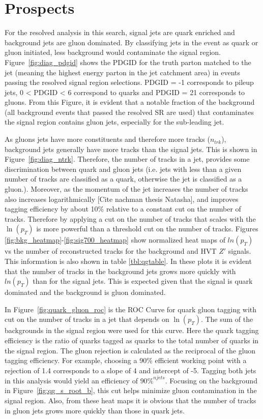 \label{ch:qg}
\chapter{Prospects}
For the resolved analysis in this search, signal jets are quark enriched and background jets are gluon dominated. By classifying jets in the event as quark or gluon initiated, less background would contaminate the signal region. Figure~\ref{fig:diag_pdgid} shows the PDGID for the truth parton matched to the jet (meaning the highest energy parton in the jet catchment area) in events passing the resolved signal region selections. PDGID = -1 corresponds to pileup jets, 0 < PDGID < 6 correspond to quarks and PDGID = 21 corresponds to gluons. From this Figure, it is evident that a notable fraction of the background (all background events that passed the resolved SR are used) that contaminates the signal region contains gluon jets, especially for the sub-leading jet. 

As gluons jets have more constituents and therefore more tracks ($n_{trk}$), background jets generally have more tracks than the signal jets. This is shown in Figure~\ref{fig:diag_ntrk}. Therefore, the number of tracks in a jet, provides some discrimination between quark and gluon jets (i.e. jets with less than a given number of tracks are classified as a quark, otherwise the jet is classified as a gluon.). Moreover, as the momentum of the jet increases the number of tracks also increases logarithmically [Cite nachman thesis Natasha], and improves tagging efficiency by about 10\% relative to a constant cut on the number of tracks. Therefore by applying a cut on the number of tracks that scales with the $\ln(p_{T})$ is more powerful than a threshold cut on the number of tracks. Figures \ref{fig:bkg_heatmap}-\ref{fig:sig700_heatmap} show normalized heat maps of $ln(p_{T})$ vs the number of reconstructed tracks for the background and HVT $Z'$ signals. This information is also shown in table \ref{tbl:qgtable}. In these plots it is evident that the number of tracks in the background jets grows more quickly with $ln(p_{T})$ than for the signal jets. This is expected given that the signal is quark dominated and the background is gluon dominated. 

In Figure~\ref{fig:quark_gluon_roc} is the ROC Curve for quark gluon tagging with cut on the number of tracks in a jet that depends on $\ln(p_{T})$. The sum of the backgrounds in the signal region were used for this curve. Here the quark tagging efficiency is the ratio of quarks tagged as quarks to the total number of quarks in the signal region. The gluon rejection is calculated as the reciprocal of the gluon tagging efficiency. For example, choosing a 90\% efficient working point with a rejection of 1.4 corresponds to a slope of 4 and intercept of -5. Tagging both jets in this analysis would yield an efficiency of $90\%^{njets}$. Focusing on the background in Figure~\ref{fig:qg_s_root_b}, this cut helps minimize gluon contamination in the signal region. Also, from these heat maps it is obvious that the number of tracks in gluon jets grows more quickly than those in quark jets.
\pagebreak

